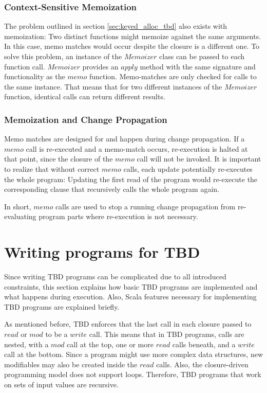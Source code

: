 \subsubsection{Context-Sensitive Memoization}

The problem outlined in section \ref{sec:keyed_alloc_tbd} also exists with memoization: Two distinct functions might memoize against the same arguments. In this case, memo matches would occur despite the closure is a different one. To solve this problem, an instance of the $Memoizer$ class can be passed to each function call. $Memoizer$ provides an $apply$ method with the same signature and functionality as the $memo$ function. Memo-matches are only checked for calls to the same instance. That means that for two different instances of the $Memoizer$ function, identical calls can return different results. 

\subsubsection{Memoization and Change Propagation}
Memo matches are designed for and happen during change propagation. If a $memo$ call is re-executed and a memo-match occurs, re-execution is halted at that point, since the closure of the $memo$ call will not be invoked. It is important to realize that without correct $memo$ calls, each update potentially re-executes the whole program: Updating the first read of the program would re-execute the corresponding clause that recursively calls the whole program again. 

In short, $memo$ calls are used to stop a running change propagation from re-evaluating program parts where re-execution is not necessary. 

\section{Writing programs for TBD}

Since writing TBD programs can be complicated due to all introduced constraints, this section explains how basic TBD programs are implemented and what happens during execution. Also, Scala features necessary for implementing TBD programs are explained briefly. 

As mentioned before, TBD enforces that the last call in each closure passed to $read$ or $mod$ to be a $write$ call. This means that in TBD programs, calls are nested, with a $mod$ call at the top, one or more $read$ calls beneath, and a $write$ call at the bottom. Since a program might use more complex data structures, new modifiables may also be created inside the $read$ calls. Also, the closure-driven programming model does not support loops. Therefore, TBD programs that work on sets of input values are recursive. 

